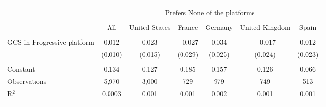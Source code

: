 
\begin{tabular}{@{\extracolsep{5pt}}lcccccc} 
\\[-1.8ex]\hline 
\hline \\[-1.8ex] 
 & \multicolumn{6}{c}{Prefers None of the platforms} \\ 
\cline{2-7} 
\\[-1.8ex] & All & United States & France & Germany & United Kingdom & Spain \\ 
\hline \\[-1.8ex] 
 GCS in Progressive platform & 0.012 & 0.023 & $-$0.027 & 0.034 & $-$0.017 & 0.012 \\ 
  & (0.010) & (0.015) & (0.029) & (0.025) & (0.024) & (0.023) \\ 
 \hline \\[-1.8ex] 
Constant & 0.134 & 0.127 & 0.185 & 0.157 & 0.126 & 0.066 \\ 
Observations & 5,970 & 3,000 & 729 & 979 & 749 & 513 \\ 
R$^{2}$ & 0.0003 & 0.001 & 0.001 & 0.002 & 0.001 & 0.001 \\ 
\hline 
\hline \\[-1.8ex] 
\end{tabular} 